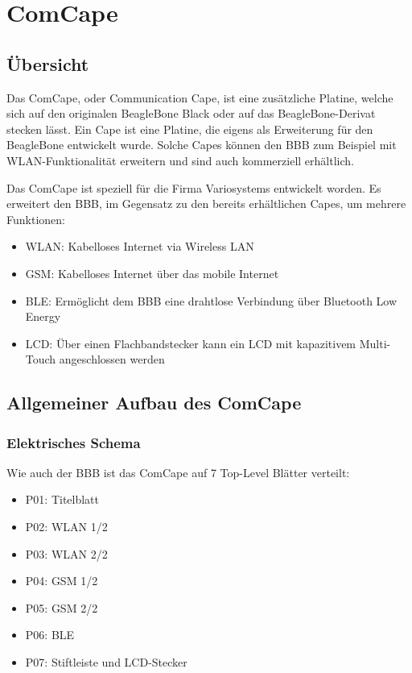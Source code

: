 \chapter{ComCape}


\section{Übersicht}
Das ComCape, oder Communication Cape, ist eine zusätzliche Platine, welche sich auf den originalen BeagleBone Black oder auf das BeagleBone-Derivat stecken lässt. Ein Cape ist eine Platine, die eigens als Erweiterung für den BeagleBone entwickelt wurde. Solche Capes können den BBB zum Beispiel mit WLAN-Funktionalität erweitern und sind auch kommerziell erhältlich.

Das ComCape ist speziell für die Firma Variosystems entwickelt worden. Es erweitert den BBB, im Gegensatz zu den bereits erhältlichen Capes, um mehrere Funktionen:

\begin{itemize}
\item WLAN: Kabelloses Internet via Wireless LAN
\item GSM: Kabelloses Internet über das mobile Internet
\item BLE: Ermöglicht dem BBB eine drahtlose Verbindung über Bluetooth Low Energy
\item LCD: Über einen Flachbandstecker kann ein LCD mit kapazitivem Multi-Touch angeschlossen werden
\end{itemize}



\section{Allgemeiner Aufbau des ComCape}

\subsection{Elektrisches Schema}
Wie auch der BBB ist das ComCape auf 7 Top-Level Blätter verteilt:

\begin{itemize}
\item P01: Titelblatt
\item P02: WLAN 1/2
\item P03: WLAN 2/2
\item P04: GSM 1/2
\item P05: GSM 2/2
\item P06: BLE
\item P07: Stiftleiste und LCD-Stecker
\end{itemize}

